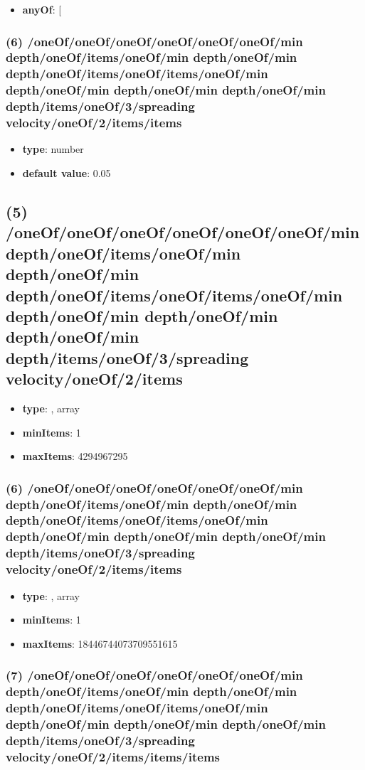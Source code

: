 \begin{itemize}[leftmargin=6em]\item {\bf anyOf}: [\end{itemize}\subsubsection{(6) /oneOf/oneOf/oneOf/oneOf/oneOf/oneOf/min depth/oneOf/items/oneOf/min depth/oneOf/min depth/oneOf/items/oneOf/items/oneOf/min depth/oneOf/min depth/oneOf/min depth/oneOf/min depth/items/oneOf/3/spreading velocity/oneOf/2/items/items}
\begin{itemize}[leftmargin=6em]\item {\bf type}: number\item {\bf default value}: 0.05
\end{itemize}\subsection{(5) /oneOf/oneOf/oneOf/oneOf/oneOf/oneOf/min depth/oneOf/items/oneOf/min depth/oneOf/min depth/oneOf/items/oneOf/items/oneOf/min depth/oneOf/min depth/oneOf/min depth/oneOf/min depth/items/oneOf/3/spreading velocity/oneOf/2/items}
\begin{itemize}[leftmargin=5em]\item {\bf type}: , array\item {\bf minItems}: 1
\item {\bf maxItems}: 4294967295
\end{itemize}\subsubsection{(6) /oneOf/oneOf/oneOf/oneOf/oneOf/oneOf/min depth/oneOf/items/oneOf/min depth/oneOf/min depth/oneOf/items/oneOf/items/oneOf/min depth/oneOf/min depth/oneOf/min depth/oneOf/min depth/items/oneOf/3/spreading velocity/oneOf/2/items/items}
\begin{itemize}[leftmargin=6em]\item {\bf type}: , array\item {\bf minItems}: 1
\item {\bf maxItems}: 18446744073709551615
\end{itemize}\subsubsection{(7) /oneOf/oneOf/oneOf/oneOf/oneOf/oneOf/min depth/oneOf/items/oneOf/min depth/oneOf/min depth/oneOf/items/oneOf/items/oneOf/min depth/oneOf/min depth/oneOf/min depth/oneOf/min depth/items/oneOf/3/spreading velocity/oneOf/2/items/items/items}
